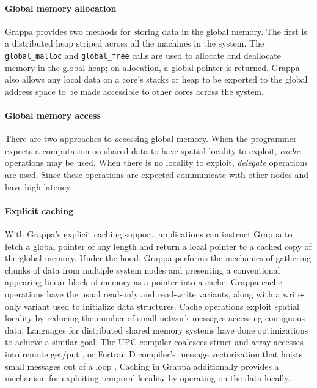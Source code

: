 \paragraph{Global memory allocation}
Grappa provides two methods for {\emph storing} data in the global memory. The
first is a distributed heap striped across all the machines in the
system. The \texttt{global\_malloc} and \texttt{global\_free} calls
are used to allocate and deallocate memory in the global heap; on
allocation, a global pointer is returned. Grappa also allows any local
data on a core's stacks or heap to be exported to the global address
space to be made accessible to other cores across the system.

\paragraph{Global memory access}
There are two approaches to {\emph accessing} global memory. When the
programmer expects a computation on shared data to have spatial
locality to exploit, {\em cache} operations may be used. When there is no locality to
exploit, {\em delegate} operations are used. Since these operations
are expected communicate with other nodes and have high latency,

\paragraph{Explicit caching}
With Grappa's explicit caching support, applications can instruct Grappa to fetch a global
pointer of any length and return a local pointer to a cached copy of
the global memory. Under the hood, Grappa performs the mechanics of
gathering chunks of data from multiple system nodes and presenting a
conventional appearing linear block of memory as a pointer into a
cache. Grappa cache operations have the usual read-only and read-write
variants, along with a write-only variant used to initialize data
structures. Cache operations exploit spatial locality by reducing the number of small network
messages accessing contiguous data. Languages for distributed
shared memory systems have done optimizations to achieve a similar goal. The UPC compiler
coalesces struct and array accesses into 
remote get/put \cite{Chen:2005}, or Fortran D compiler's message
vectorization that hoists small messages out of a loop
\cite{FortranD:1992}. Caching in Grappa additionally provides a
mechanism for exploiting temporal locality by operating on the data locally. 

